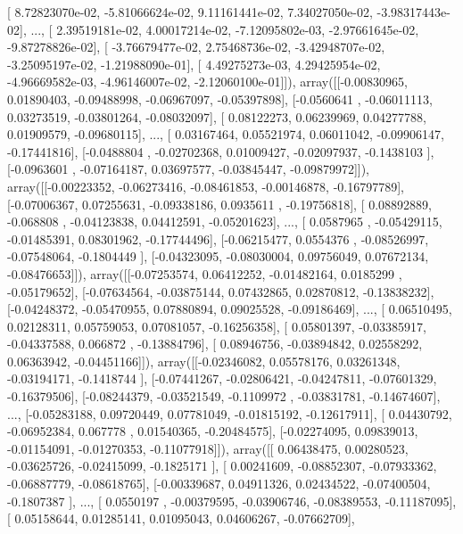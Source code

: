 \documentclass{article}
\begin{document}
       [  8.72823070e-02,  -5.81066624e-02,   9.11161441e-02,
          7.34027050e-02,  -3.98317443e-02],
       ..., 
       [  2.39519181e-02,   4.00017214e-02,  -7.12095802e-03,
         -2.97661645e-02,  -9.87278826e-02],
       [ -3.76679477e-02,   2.75468736e-02,  -3.42948707e-02,
         -3.25095197e-02,  -1.21988090e-01],
       [  4.49275273e-03,   4.29425954e-02,  -4.96669582e-03,
         -4.96146007e-02,  -2.12060100e-01]]), array([[-0.00830965,  0.01890403, -0.09488998, -0.06967097, -0.05397898],
       [-0.0560641 , -0.06011113,  0.03273519, -0.03801264, -0.08032097],
       [ 0.08122273,  0.06239969,  0.04277788,  0.01909579, -0.09680115],
       ..., 
       [ 0.03167464,  0.05521974,  0.06011042, -0.09906147, -0.17441816],
       [-0.0488804 , -0.02702368,  0.01009427, -0.02097937, -0.1438103 ],
       [-0.0963601 , -0.07164187,  0.03697577, -0.03845447, -0.09879972]]), array([[-0.00223352, -0.06273416, -0.08461853, -0.00146878, -0.16797789],
       [-0.07006367,  0.07255631, -0.09338186,  0.0935611 , -0.19756818],
       [ 0.08892889, -0.068808  , -0.04123838,  0.04412591, -0.05201623],
       ..., 
       [ 0.0587965 , -0.05429115, -0.01485391,  0.08301962, -0.17744496],
       [-0.06215477,  0.0554376 , -0.08526997, -0.07548064, -0.1804449 ],
       [-0.04323095, -0.08030004,  0.09756049,  0.07672134, -0.08476653]]), array([[-0.07253574,  0.06412252, -0.01482164,  0.0185299 , -0.05179652],
       [-0.07634564, -0.03875144,  0.07432865,  0.02870812, -0.13838232],
       [-0.04248372, -0.05470955,  0.07880894,  0.09025528, -0.09186469],
       ..., 
       [ 0.06510495,  0.02128311,  0.05759053,  0.07081057, -0.16256358],
       [ 0.05801397, -0.03385917, -0.04337588,  0.066872  , -0.13884796],
       [ 0.08946756, -0.03894842,  0.02558292,  0.06363942, -0.04451166]]), array([[-0.02346082,  0.05578176,  0.03261348, -0.03194171, -0.1418744 ],
       [-0.07441267, -0.02806421, -0.04247811, -0.07601329, -0.16379506],
       [-0.08244379, -0.03521549, -0.1109972 , -0.03831781, -0.14674607],
       ..., 
       [-0.05283188,  0.09720449,  0.07781049, -0.01815192, -0.12617911],
       [ 0.04430792, -0.06952384,  0.067778  ,  0.01540365, -0.20484575],
       [-0.02274095,  0.09839013, -0.01154091, -0.01270353, -0.11077918]]), array([[ 0.06438475,  0.00280523, -0.03625726, -0.02415099, -0.1825171 ],
       [ 0.00241609, -0.08852307, -0.07933362, -0.06887779, -0.08618765],
       [-0.00339687,  0.04911326,  0.02434522, -0.07400504, -0.1807387 ],
       ..., 
       [ 0.0550197 , -0.00379595, -0.03906746, -0.08389553, -0.11187095],
       [ 0.05158644,  0.01285141,  0.01095043,  0.04606267, -0.07662709],
\end{document}
